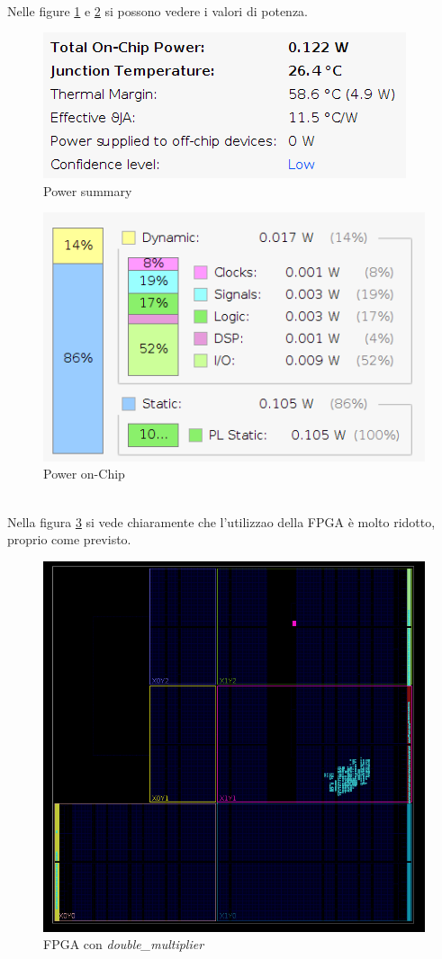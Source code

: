 \documentclass[]{IEEEtran}
\begin{document}
\\Nelle figure \ref{fig:POWER_SUMMARY} e \ref{fig:POWER_ONCHIP} si possono vedere i valori di potenza.
\begin{figure}[!htb]
    \centering
    \includegraphics[width=0.7\linewidth]{figures/power_summary}
    \caption{Power summary}
    \label{fig:POWER_SUMMARY}
\end{figure}
\begin{figure}[!htb]
    \centering
    \includegraphics[width=0.7\linewidth]{figures/power_onChip}
    \caption{Power on-Chip}
    \label{fig:POWER_ONCHIP}
\end{figure}
\\Nella figura \ref{fig:DEVICE} si vede chiaramente che l'utilizzao della FPGA è molto ridotto, proprio come previsto.
\begin{figure}[!htb]
    \centering
    \includegraphics[width=0.9\linewidth]{figures/device}
    \caption{FPGA con \textit{double\_multiplier}}
    \label{fig:DEVICE}
\end{figure}
\end{document}
